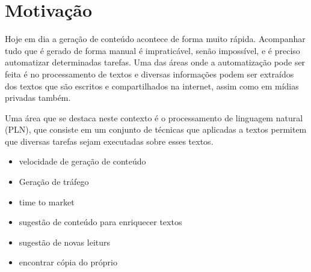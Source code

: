 \section{Motivação}

Hoje em dia a geração de conteúdo acontece de forma muito rápida. Acompanhar tudo que é gerado de forma manual é impraticável, senão impossível, e é
preciso automatizar determinadas tarefas. Uma das áreas onde a automatização pode ser feita é no processamento de textos e diversas informações podem ser 
extraídos dos textos que são escritos e compartilhados na internet, assim como em mídias privadas também.

Uma área que se destaca neste contexto é o processamento de linguagem natural (PLN), que consiste em um conjunto de técnicas que aplicadas a textos
permitem que diversas tarefas sejam executadas sobre esses textos.

\begin{itemize}
    \item velocidade de geração de conteúdo
    \item Geração de tráfego
    \item time to market
    \item sugestão de conteúdo para enriquecer textos
    \item sugestão de novas leiturs
    \item encontrar cópia do próprio
\end{itemize}